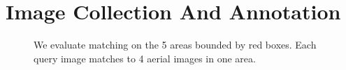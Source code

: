 \section{Image Collection And Annotation}

\label{sec:image}



\begin{figure}[ht] 
\centering
{}
\caption[]{ We evaluate matching on the 5 areas bounded by red boxes.  Each query image matches to 4 aerial images in one area.}
\label{dataset}
\end{figure}
